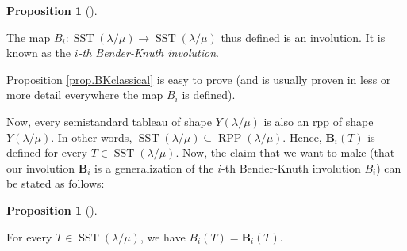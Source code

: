 \documentclass[numbers=enddot,12pt,final,onecolumn,notitlepage]{scrartcl}%
\theoremstyle{definition}
\newtheorem{prop}[theo]{Proposition}
\newenvironment{proposition}[1][]
{\begin{prop}[#1]\begin{leftbar}}
{\end{leftbar}\end{prop}}
\begin{document}
\begin{proposition}
\label{prop.BKclassical}The map $B_{i}:\operatorname*{SST}\left(  \lambda
/\mu\right)  \rightarrow\operatorname*{SST}\left(  \lambda/\mu\right)  $ thus
defined is an involution. It is known as the $i$\textit{-th Bender-Knuth
involution}.
\end{proposition}

Proposition \ref{prop.BKclassical} is easy to prove (and is usually proven in
less or more detail everywhere the map $B_{i}$ is defined).

Now, every semistandard tableau of shape $Y\left(  \lambda/\mu\right)  $ is
also an rpp of shape $Y\left(  \lambda/\mu\right)  $. In other words,
$\operatorname*{SST}\left(  \lambda/\mu\right)  \subseteq\operatorname*{RPP}%
\left(  \lambda/\mu\right)  $. Hence, $\mathbf{B}_{i}\left(  T\right)  $ is
defined for every $T\in\operatorname*{SST}\left(  \lambda/\mu\right)  $. Now,
the claim that we want to make (that our involution $\mathbf{B}_{i}$ is a
generalization of the $i$-th Bender-Knuth involution $B_{i}$) can be stated as follows:

\begin{proposition}
\label{prop.BK=BK}For every $T\in\operatorname*{SST}\left(  \lambda
/\mu\right)  $, we have $B_{i}\left(  T\right)  =\mathbf{B}_{i}\left(
T\right)  $.
\end{proposition}
\end{document}
